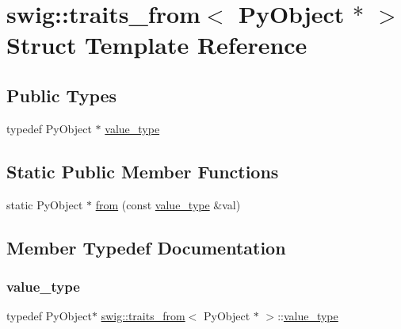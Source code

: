 \hypertarget{structswig_1_1traits__from_3_01_py_object_01_5_01_4}{}\section{swig\+:\+:traits\+\_\+from$<$ Py\+Object $\ast$ $>$ Struct Template Reference}
\label{structswig_1_1traits__from_3_01_py_object_01_5_01_4}
\subsection*{Public Types}
\begin{DoxyCompactItemize}
\item 
typedef Py\+Object $\ast$ \hyperlink{structswig_1_1traits__from_3_01_py_object_01_5_01_4_a3f736b20ca687eb0894c64d1b8ec2b11}{value\+\_\+type}
\end{DoxyCompactItemize}
\subsection*{Static Public Member Functions}
\begin{DoxyCompactItemize}
\item 
static Py\+Object $\ast$ \hyperlink{structswig_1_1traits__from_3_01_py_object_01_5_01_4_ab383a520e9f35b0d778819da07efd42d}{from} (const \hyperlink{structswig_1_1traits__from_3_01_py_object_01_5_01_4_a3f736b20ca687eb0894c64d1b8ec2b11}{value\+\_\+type} \&val)
\end{DoxyCompactItemize}


\subsection{Member Typedef Documentation}
\mbox{\label{structswig_1_1traits__from_3_01_py_object_01_5_01_4_a3f736b20ca687eb0894c64d1b8ec2b11}} 
\subsubsection{\texorpdfstring{value\+\_\+type}{value\_type}}
{\footnotesize\ttfamily typedef Py\+Object$\ast$ \hyperlink{structswig_1_1traits__from}{swig\+::traits\+\_\+from}$<$ Py\+Object $\ast$ $>$\+::\hyperlink{structswig_1_1traits__from_3_01_py_object_01_5_01_4_a3f736b20ca687eb0894c64d1b8ec2b11}{value\+\_\+type}}



